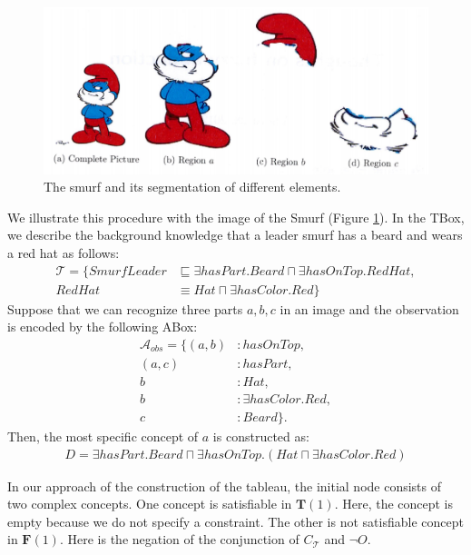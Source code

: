 \documentclass{article}
\begin{document}
\begin{figure}[h]
  \centering
   \includegraphics[scale=.3]{./figures/smurf.png}
   \caption{\label{fig:smurf}The smurf and its segmentation of different elements.}
 \end{figure} 
We illustrate this procedure with the image of the Smurf (Figure \ref{fig:smurf}).
In the TBox, we describe the background knowledge that a leader smurf has a beard and wears a red hat as follows:
\begin{align*}
\mathcal{T}=\{SmurfLeader &\sqsubseteq \exists hasPart.Beard \sqcap \exists hasOnTop.RedHat, \\
RedHat &\equiv Hat \sqcap \exists hasColor.Red \} 
\end{align*}
Suppose that we can recognize three parts $a,b,c$ in an image and the observation is encoded by the following ABox:
\begin{align*}
\mathcal{A}_{obs} =\{(a,b)&: hasOnTop, \\
 (a,c)&: hasPart,\\
 b&:Hat,\\
 b&:\exists hasColor.Red,\\
 c&:Beard\}.
\end{align*}
Then, the most specific concept of $a$ is constructed as:
\begin{align*}
D=\exists hasPart.Beard \sqcap \exists hasOnTop.(Hat \sqcap  \exists hasColor.Red) 
\end{align*}

In our approach of the construction of the tableau, the initial node consists of two complex concepts.
One concept is satisfiable in $\mathbf{T}(1)$. Here, the concept is empty because we do not specify  a constraint.
The other is not satisfiable concept in $ \mathbf{F} (1) $. Here is the negation of the conjunction of $ C_\mathcal{T}$ and $ \neg O$. 
\end{document}
